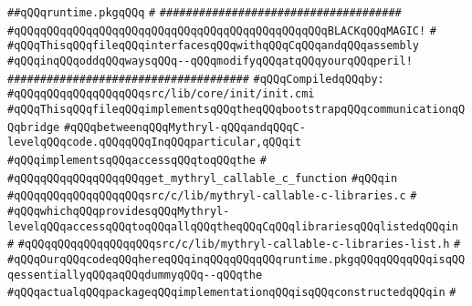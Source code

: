 \label{src/lib/core/init/runtime.pkg}
\verb|##qQQqruntime.pkgqQQq|\newline
\verb|#|\newline
\verb|#####################################|\newline
\verb|#qQQqqQQqqQQqqQQqqQQqqQQqqQQqqQQqqQQqqQQqqQQqqQQqBLACKqQQqMAGIC!|\newline
\verb|#|\newline
\verb|#qQQqThisqQQqfileqQQqinterfacesqQQqwithqQQqCqQQqandqQQqassembly|\newline
\verb|#qQQqinqQQqoddqQQqwaysqQQq--qQQqmodifyqQQqatqQQqyourqQQqperil!|\newline
\verb|#####################################|\newline
\newline
\verb|#qQQqCompiledqQQqby:|\newline
\verb|#qQQqqQQqqQQqqQQqqQQqsrc/lib/core/init/init.cmi|\newline
\newline
\newline
\verb|#qQQqThisqQQqfileqQQqimplementsqQQqtheqQQqbootstrapqQQqcommunicationqQQqbridge|\newline
\verb|#qQQqbetweenqQQqMythryl-qQQqandqQQqC-levelqQQqcode.qQQqqQQqInqQQqparticular,qQQqit|\newline
\verb|#qQQqimplementsqQQqaccessqQQqtoqQQqthe|\newline
\verb|#|\newline
\verb|#qQQqqQQqqQQqqQQqqQQqget_mythryl_callable_c_function|\newline
\verb|#qQQqin|\newline
\verb|#qQQqqQQqqQQqqQQqqQQqsrc/c/lib/mythryl-callable-c-libraries.c|\newline
\verb|#|\newline
\verb|#qQQqwhichqQQqprovidesqQQqMythryl-levelqQQqaccessqQQqtoqQQqallqQQqtheqQQqCqQQqlibrariesqQQqlistedqQQqin|\newline
\verb|#|\newline
\verb|#qQQqqQQqqQQqqQQqqQQqsrc/c/lib/mythryl-callable-c-libraries-list.h|\newline
\verb|#|\newline
\verb|#qQQqOurqQQqcodeqQQqhereqQQqinqQQqqQQqqQQqruntime.pkgqQQqqQQqqQQqisqQQqessentiallyqQQqaqQQqdummyqQQq--qQQqthe|\newline
\verb|#qQQqactualqQQqpackageqQQqimplementationqQQqisqQQqconstructedqQQqin|\newline
\verb|#|\newline
